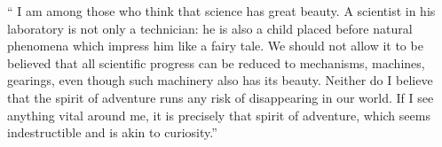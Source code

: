 \documentclass[
12pt, %
nolistspacing, %
liststotoc, %
headsepline, %
consistentlayout, %
]{MastersDoctoralThesis} %
\begin{document}
 
 









\newpage

\checktoopen
\noindent\enquote{%
I am among those who think that science has great beauty. A scientist in his laboratory is not only a technician: he is also a child placed before natural phenomena which impress him like a fairy tale. We should not allow it to be believed that all scientific progress can be reduced to mechanisms, machines, gearings, even though such machinery also has its beauty.
Neither do I believe that the spirit of adventure runs any risk of disappearing in our world. If I see anything vital around me, it is precisely that spirit of adventure, which seems indestructible and is akin to curiosity.}\bigbreak
\end{document}
